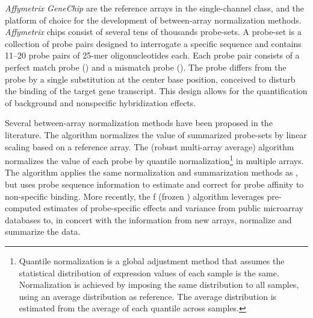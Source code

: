 \emph{Affymetrix GeneChip} are the reference arrays in the single-channel class,
and the platform of choice for the development of between-array normalization
methods.  \emph{Affymetrix} chips consist of several tens of thousands
probe-sets.  A probe-set is a collection of probe pairs designed to interrogate
a specific sequence and contains \numrange{11}{20} probe pairs of 25-mer
oligonucleotides each.  Each probe pair consists of a perfect match probe
() and a mismatch probe ().  The 
probe differs from the  probe by a single substitution at the
center base position, conceived to disturb the binding of the target gene
transcript.  This design allows for the quantification of background and
nonspecific hybridization effects.

Several between-array normalization methods have been proposed in the
literature.  The  algorithm\cite{hubbell_robust_2002} normalizes
the value of summarized probe-sets by linear scaling based on a reference array.
The  (robust multi-array average)
algorithm\cite{irizarry_exploration_2003} normalizes the value of each probe by
quantile normalization\footnote{Quantile normalization is a global adjustment
  method that assumes the statistical distribution of expression values of each
  sample is the same.  Normalization is achieved by imposing the same
  distribution to all samples, using an average distribution as reference.  The
  average distribution is estimated from the average of each quantile across
  samples.} in multiple arrays.  The 
algorithm\cite{wu_model-based_2004} applies the same normalization and
summarization methods as , but uses probe sequence information to
estimate and correct for probe affinity to non-specific binding.  More recently,
the f (frozen ) algorithm\cite{mccall_frozen_2010}
leverages pre-computed estimates of probe-specific effects and variance from
public microarray databases to, in concert with the information from new arrays,
normalize and summarize the data.




